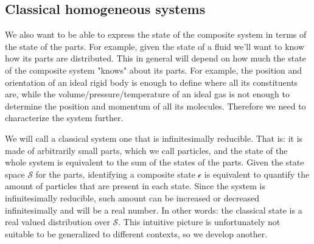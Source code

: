 \documentclass[aps,pra,10pt,twocolumn,floatfix,nofootinbib]{revtex4-1}
\theoremstyle{definition}
\begin{document}
\subsection{Classical homogeneous systems}
We also want to be able to express the state of the composite system in terms of the state of the parts. For example, given the state of a fluid we'll want to know how its parts are distributed. This in general will depend on how much the state of the composite system "knows" about its parts. For example, the position and orientation of an ideal rigid body is enough to define where all its constituents are, while the volume/pressure/temperature of an ideal gas is not enough to determine the position and momentum of all its molecules. Therefore we need to characterize the system further.

We will call a classical system one that is infinitesimally reducible. That is: it is made of arbitrarily small parts, which we call particles, and the state of the whole system is equivalent to the sum of the states of the parts. Given the state space $\mathcal{S}$ for the parts, identifying a composite state $\mathcal{c}$ is equivalent to quantify the amount of particles that are present in each state. Since the system is infinitesimally reducible, such amount can be increased or decreased infinitesimally and will be a real number. In other words: the classical state is a real valued distribution over $\mathcal{S}$. This intuitive picture is unfortunately not suitable to be generalized to different contexts, so we develop another.

\end{document}
